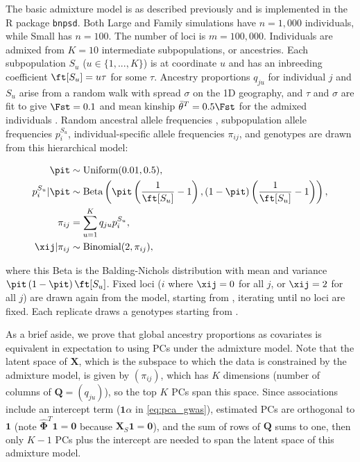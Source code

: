 \documentclass[11pt]{article}
\begin{document}
\begin{linenumbers}
The basic admixture model is as described previously \citep{ochoa_estimating_2021} and is implemented in the R package \texttt{bnpsd}.
Both Large and Family simulations have $n = 1,000$ individuals, while Small has $n = 100$.
The number of loci is $m = 100,000$.
Individuals are admixed from $K = 10$ intermediate subpopulations, or ancestries.
Each subpopulation $S_u$ ($u \in \{ 1, ..., K \}$) is at coordinate $u$ and has an inbreeding coefficient $\ft[S_u] = u \tau$ for some $\tau$.
Ancestry proportions $q_{ju}$ for individual $j$ and $S_u$ arise from a random walk with spread $\sigma$ on the 1D geography, and $\tau$ and $\sigma$ are fit to give $\Fst = 0.1$ and mean kinship $\bar{\theta}^T = 0.5 \Fst$ for the admixed individuals \citep{ochoa_estimating_2021}.
Random ancestral allele frequencies \pit, subpopulation allele frequencies $p_i^{S_u}$, individual-specific allele frequencies $\pi_{ij}$, and genotypes \xij are drawn from this hierarchical model:
\begin{linenomath*}
\begin{align*}
  \pit
  &\sim
    \text{Uniform}( 0.01, 0.5 )
    , \\
  p_i^{S_u} | \pit
  &\sim
    \text{Beta} \left(
    \pit \left( \frac{1}{ \ft[S_u] } - 1 \right),
    \left( 1 - \pit \right) \left( \frac{1}{ \ft[S_u] } - 1 \right)
    \right)
    , \\
  \pi_{ij}
  &=
    \sum_{u = 1}^K q_{ju} p_i^{S_u}
    , \\
  \xij | \pi_{ij}
  &\sim
    \text{Binomial}(2, \pi_{ij})
    ,
\end{align*}
\end{linenomath*}
where this Beta is the Balding-Nichols distribution \citep{balding_method_1995} with mean \pit and variance $\pit \left( 1 - \pit \right) \ft[S_u]$.
Fixed loci ($i$ where $\xij = 0$ for all $j$, or $\xij = 2$ for all $j$) are drawn again from the model, starting from \pit, iterating until no loci are fixed.
Each replicate draws a genotypes starting from \pit.

As a brief aside, we prove that global ancestry proportions as covariates is equivalent in expectation to using PCs under the admixture model.
Note that the latent space of $\mathbf{X}$, which is the subspace to which the data is constrained by the admixture model, is given by $(\pi_{ij})$, which has $K$ dimensions (number of columns of $\mathbf{Q} = (q_{ju})$), so the top $K$ PCs span this space.
Since associations include an intercept term ($\mathbf{1} \alpha$ in \cref{eq:pca_gwas}), estimated PCs are orthogonal to $\mathbf{1}$ (note $\mathbf{\hat{\Phi}}^T \mathbf{1} = \mathbf{0}$ because $\mathbf{X}_S \mathbf{1} = \mathbf{0}$), and the sum of rows of $\mathbf{Q}$ sums to one, then only $K-1$ PCs plus the intercept are needed to span the latent space of this admixture model.


\end{linenumbers}
\end{document}
